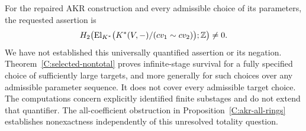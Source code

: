 \begin{obstruction}\label{C:survival-question}
For the repaired AKR construction and every admissible choice of its
parameters, the requested assertion is
\[
 H_2\!\left(\operatorname{El}_{K^*}
 \bigl(K^*(V,-)/(cv_1\sim cv_2)\bigr);\mathbb Z\right)\ne0.
\]
We have not established this universally quantified assertion or its
negation. Theorem~\ref{C:selected-nontotal} proves infinite-stage
survival for a fully specified choice of sufficiently large targets,
and more generally for such choices over any admissible parameter
sequence. It does not cover every admissible target choice. The
computations concern explicitly identified finite substages and do
not extend that quantifier. The all-coefficient obstruction in
Proposition~\ref{C:akr-all-rings} establishes nonexactness independently
of this unresolved totality question.
\end{obstruction}
